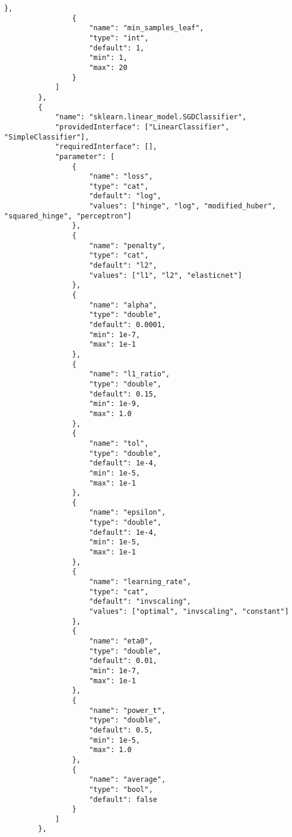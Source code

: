 \begin{Verbatim}[fontsize=\scriptsize]
                },
                {
                    "name": "min_samples_leaf",
                    "type": "int",
                    "default": 1,
                    "min": 1,
                    "max": 20
                }
            ]
        },
        {
            "name": "sklearn.linear_model.SGDClassifier",
            "providedInterface": ["LinearClassifier", "SimpleClassifier"],
            "requiredInterface": [],
            "parameter": [
                {
                    "name": "loss",
                    "type": "cat",
                    "default": "log",
                    "values": ["hinge", "log", "modified_huber", "squared_hinge", "perceptron"]
                },
                {
                    "name": "penalty",
                    "type": "cat",
                    "default": "l2",
                    "values": ["l1", "l2", "elasticnet"]
                },
                {
                    "name": "alpha",
                    "type": "double",
                    "default": 0.0001,
                    "min": 1e-7,
                    "max": 1e-1
                },
                {
                    "name": "l1_ratio",
                    "type": "double",
                    "default": 0.15,
                    "min": 1e-9,
                    "max": 1.0
                },
                {
                    "name": "tol",
                    "type": "double",
                    "default": 1e-4,
                    "min": 1e-5,
                    "max": 1e-1
                },
                {
                    "name": "epsilon",
                    "type": "double",
                    "default": 1e-4,
                    "min": 1e-5,
                    "max": 1e-1
                },
                {
                    "name": "learning_rate",
                    "type": "cat",
                    "default": "invscaling",
                    "values": ["optimal", "invscaling", "constant"]
                },
                {
                    "name": "eta0",
                    "type": "double",
                    "default": 0.01,
                    "min": 1e-7,
                    "max": 1e-1
                },
                {
                    "name": "power_t",
                    "type": "double",
                    "default": 0.5,
                    "min": 1e-5,
                    "max": 1.0
                },
                {
                    "name": "average",
                    "type": "bool",
                    "default": false
                }
            ]
        },

\end{Verbatim}
